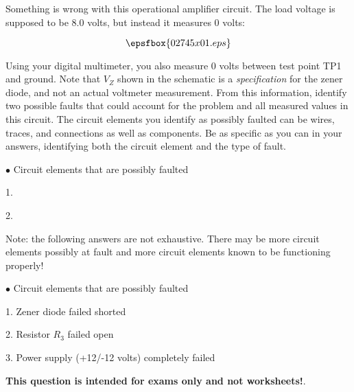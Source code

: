 

Something is wrong with this operational amplifier circuit.  The load voltage is supposed to be 8.0 volts, but instead it measures 0 volts:

$$\epsfbox{02745x01.eps}$$

Using your digital multimeter, you also measure 0 volts between test point TP1 and ground.  Note that $V_Z$ shown in the schematic is a {\it specification} for the zener diode, and not an actual voltmeter measurement.  From this information, identify two possible faults that could account for the problem and all measured values in this circuit.  The circuit elements you identify as possibly faulted can be wires, traces, and connections as well as components.  Be as specific as you can in your answers, identifying both the circuit element and the type of fault.

\medskip
\item{$\bullet$} Circuit elements that are possibly faulted
\item{1.}
\item{2.} 
\medskip







Note: the following answers are not exhaustive.  There may be more circuit elements possibly at fault and more circuit elements known to be functioning properly!

\medskip
\item{$\bullet$} Circuit elements that are possibly faulted
\item{1.} Zener diode failed shorted
\item{2.} Resistor $R_3$ failed open
\item{3.} Power supply (+12/-12 volts) completely failed
\medskip







{\bf This question is intended for exams only and not worksheets!}.




